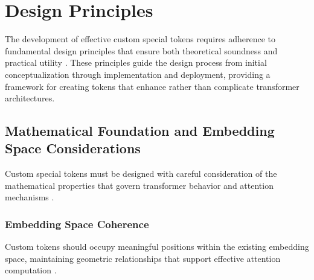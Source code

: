 
\section{Design Principles}

The development of effective custom special tokens requires adherence to fundamental design principles that ensure both theoretical soundness and practical utility \citep{vaswani2017attention, tenney2019bert}. These principles guide the design process from initial conceptualization through implementation and deployment, providing a framework for creating tokens that enhance rather than complicate transformer architectures.

\subsection{Mathematical Foundation and Embedding Space Considerations}

Custom special tokens must be designed with careful consideration of the mathematical properties that govern transformer behavior and attention mechanisms \citep{clark2019what, michel2019sixteen}.

\subsubsection{Embedding Space Coherence}

Custom tokens should occupy meaningful positions within the existing embedding space, maintaining geometric relationships that support effective attention computation \citep{reif2019visualizing, ethayarajh2019contextual}.
\begin{comment}
Feedback: This is a good principle, but it's abstract. A concrete example would help. For instance: "A practical application of this principle is in initialization. Instead of initializing a new custom token with pure random noise, it's often better to initialize it with the average of the embeddings of semantically related words. For example, a new `<LEGAL_ARGUMENT>` token could be initialized with the average of the embeddings for 'therefore', 'because', and 'pursuant to'. This gives the model a better starting point and can speed up training."
\end{comment}

